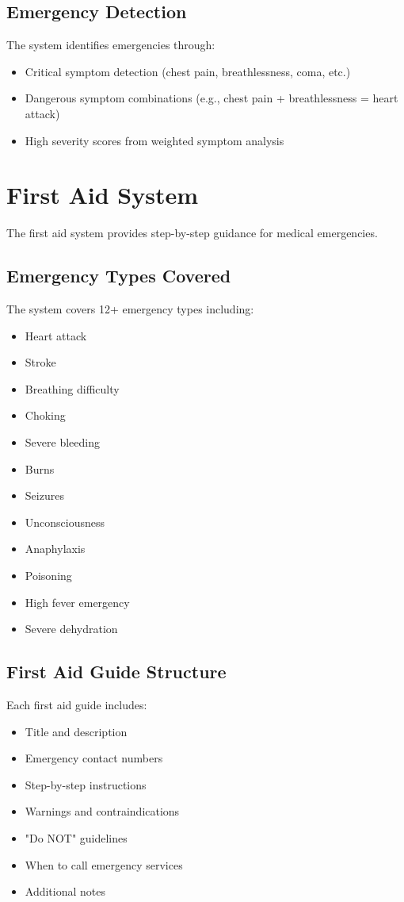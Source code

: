 \subsection{Emergency Detection}
The system identifies emergencies through:

\begin{itemize}
    \item Critical symptom detection (chest pain, breathlessness, coma, etc.)
    \item Dangerous symptom combinations (e.g., chest pain + breathlessness = heart attack)
    \item High severity scores from weighted symptom analysis
\end{itemize}

\section{First Aid System}
The first aid system provides step-by-step guidance for medical emergencies.

\subsection{Emergency Types Covered}
The system covers 12+ emergency types including:

\begin{itemize}
    \item Heart attack
    \item Stroke
    \item Breathing difficulty
    \item Choking
    \item Severe bleeding
    \item Burns
    \item Seizures
    \item Unconsciousness
    \item Anaphylaxis
    \item Poisoning
    \item High fever emergency
    \item Severe dehydration
\end{itemize}

\subsection{First Aid Guide Structure}
Each first aid guide includes:

\begin{itemize}
    \item Title and description
    \item Emergency contact numbers
    \item Step-by-step instructions
    \item Warnings and contraindications
    \item "Do NOT" guidelines
    \item When to call emergency services
    \item Additional notes
\end{itemize}

